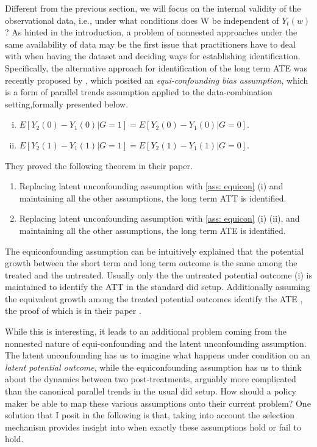 \documentclass{article}
\begin{document}
     Different from the previous section, we will focus on the internal validity of the observational data, i.e., under what conditions does W be independent of $Y_t(w)$ ?
     As hinted in the introduction, a problem of nonnested approaches under the same availability of data may be the first issue that practitioners have to deal with when having the dataset and deciding ways for establishing identification.
    Specifically, the alternative approach for identification of the long term ATE was recently proposed by \cite{ghassami et al 2022} , which posited an \textit{equi-confounding bias assumption}, which is a form of parallel trends assumption applied to the data-combination setting,formally presented below.
    \begin{assumption}\mbox{}
     \label{ass: equicon}
     \begin{enumerate}[(i)]
         \item $E[Y_2(0) - Y_1(0)| G= 1] = E[Y_2(0) - Y_1(0) | G=0]$.
         \item $ E[Y_2(1) - Y_1(1)| G= 1] = E[Y_2(1) - Y_1(1) | G=0]$.
     \end{enumerate}
     \end{assumption}
They proved the following theorem in their paper.
 \begin{theorem}\mbox{}
     \begin{enumerate}
         \item Replacing latent unconfounding assumption with \ref{ass: equicon} (i) and maintaining all the other assumptions, the long term ATT is identified.
         \item Replacing latent unconfounding assumption with \ref{ass: equicon} (i) (ii), and maintaining all the other assumptions, the long term ATE is identified.
     \end{enumerate}
 \end{theorem}
 
The equiconfounding assumption can be intuitively explained that the potential growth between the short term and long term outcome is the same among the treated and the untreated. Usually only the the untreated potential outcome (i) is maintained to identify the ATT in the standard did setup. Additionally assuming the equivalent growth among the treated potential outcomes identify the ATE , the proof of which is in their paper \cite{ghassami 202}.

While this is interesting, it leads to an additional problem coming from the nonnested nature of equi-confounding and the latent unconfounding assumption. The latent unconfounding has us to imagine what happens under condition on an \textit{latent potential outcome}, while the equiconfounding assumption has us to think about the dynamics between two post-treatments, arguably more complicated than the canonical parallel trends in the usual did setup.  How should a policy maker be able to map these various assumptions onto their current problem? One solution that I posit in the following is that, taking into account the selection mechanism provides insight into when exactly these assumptions hold or fail to hold.
\end{document}

